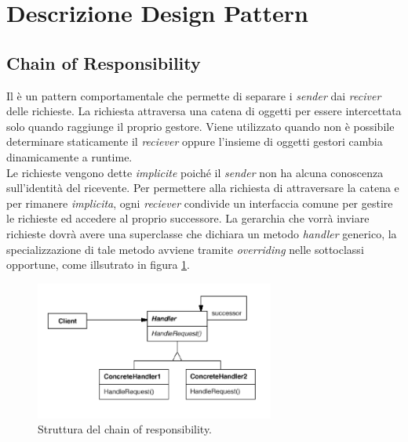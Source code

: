 \pagebreak
\section{Descrizione Design Pattern}
\label{appendice-pattern}

	\subsection{Chain of Responsibility} %
	Il  è un pattern comportamentale che permette di separare i \emph{sender} dai \emph{reciver} delle richieste. La richiesta attraversa una catena di oggetti per essere intercettata solo quando raggiunge il proprio gestore. Viene utilizzato quando non è possibile determinare staticamente il \emph{reciever} oppure l'insieme di oggetti gestori cambia dinamicamente a runtime. \\ Le richieste vengono dette \emph{implicite} poiché il \emph{sender} non ha alcuna conoscenza sull'identità del ricevente. Per permettere alla richiesta di attraversare la catena e per rimanere \emph{implicita}, ogni \emph{reciever} condivide un interfaccia comune per gestire le richieste ed accedere al proprio successore. 
	La gerarchia che vorrà inviare richieste dovrà avere una superclasse che dichiara un metodo \emph{handler} generico, la specializzazione di tale metodo avviene tramite \emph{overriding} nelle sottoclassi opportune, come illsutrato in figura \ref{fig:chainofresponsibility}.
	
	\begin{figure}[h]
	\centering \includegraphics[width=0.7\textwidth]{patterns/ChainOfResponsability.png}
	\caption{Struttura del chain of responsibility.}
	\label{fig:chainofresponsibility}
	\end{figure}
	
